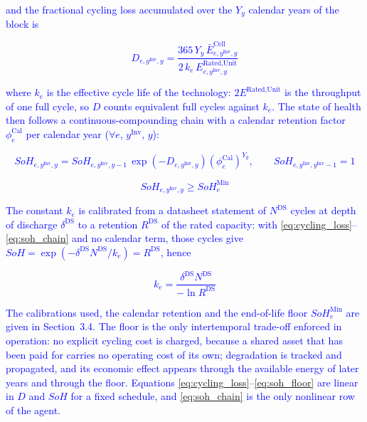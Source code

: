 \textcolor{blue}{and the fractional cycling loss accumulated over the $Y_y$ calendar years of the block is}

\textcolor{blue}{
    \begin{equation}
        D_{e,y^\text{Inv},y} =
        \frac{365 \, Y_y \, \bar{E}^{\text{Cell}}_{e,y^\text{Inv},y}}
             {2 \, k_e \, E^{\text{Rated,Unit}}_{e,y^\text{Inv},y}}
        \label{eq:cycling_loss}
    \end{equation}
}

\noindent
\textcolor{blue}{where $k_e$ is the effective cycle life of the technology: $2 E^{\text{Rated,Unit}}$ is the
throughput of one full cycle, so $D$ counts equivalent full cycles against $k_e$. The state of health then
follows a continuous-compounding chain with a calendar retention factor $\phi^{\text{Cal}}_e$ per calendar
year ($\forall e$, $y^\text{Inv}$, $y$):}

\textcolor{blue}{
    \begin{equation}
        SoH_{e,y^\text{Inv},y} = SoH_{e,y^\text{Inv},y-1} \, \exp\!\left(-D_{e,y^\text{Inv},y}\right)
        \left(\phi^{\text{Cal}}_e\right)^{Y_y},
        \qquad SoH_{e,y^\text{Inv},y^\text{Inv}-1} = 1
        \label{eq:soh_chain}
    \end{equation}
}

\textcolor{blue}{
    \begin{equation}
        SoH_{e,y^\text{Inv},y} \ge SoH^{\text{Min}}_e
        \label{eq:soh_floor}
    \end{equation}
}

\textcolor{blue}{The constant $k_e$ is calibrated from a datasheet statement of $N^{\text{DS}}$ cycles at depth of
discharge $\delta^{\text{DS}}$ to a retention $R^{\text{DS}}$ of the rated capacity: with
\eqref{eq:cycling_loss}--\eqref{eq:soh_chain} and no calendar term, those cycles give
$SoH = \exp(-\delta^{\text{DS}} N^{\text{DS}} / k_e) = R^{\text{DS}}$, hence}

\textcolor{blue}{
    \begin{equation}
        k_e = \frac{\delta^{\text{DS}} N^{\text{DS}}}{-\ln R^{\text{DS}}}
        \label{eq:cycle_life_calibration}
    \end{equation}
}

\noindent
\textcolor{blue}{The calibrations used, the calendar retention and the end-of-life floor $SoH^{\text{Min}}_e$ are
given in Section~3.4. The floor is the only intertemporal trade-off enforced in operation: no explicit
cycling cost is charged, because a shared asset that has been paid for carries no operating cost of its own;
degradation is tracked and propagated, and its economic effect appears through the available energy of later
years and through the floor. Equations \eqref{eq:cycling_loss}--\eqref{eq:soh_floor} are linear in $D$ and
$SoH$ for a fixed schedule, and \eqref{eq:soh_chain} is the only nonlinear row of the agent.}

